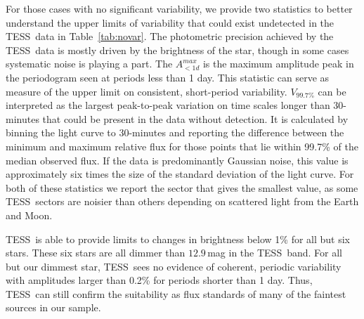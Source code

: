 \documentclass[twocolumn]{aastex631}
\newcommand{\tess}{TESS}
\begin{document}
For those cases with no significant variability, we provide two statistics to better understand the upper limits of variability that could exist undetected in the \tess\ data in Table~\ref{tab:novar}. The photometric precision achieved by the \tess\ data is mostly driven by the brightness of the star, though in some cases systematic noise is playing a part. The $A^{max}_{<1d}$ is the maximum amplitude peak in the periodogram seen at periods less than 1 day. This statistic can serve as measure of the upper limit on consistent, short-period variability. $V_{99.7\%}$ can be interpreted as the largest peak-to-peak variation on time scales longer than 30-minutes that could be present in the data without detection. It is calculated by binning the light curve to 30-minutes and reporting the difference between the minimum and maximum relative flux for those points that lie within 99.7\% of the median observed flux. If the data is predominantly Gaussian noise, this value is approximately six times the size of the standard deviation of the light curve. For both of these statistics we report the sector that gives the smallest value, as some \tess\ sectors are noisier than others depending on scattered light from the Earth and Moon. 

\tess\ is able to provide limits to changes in brightness below 1\%  for all but six stars. These six stars are all dimmer than $12.9$\,mag in the \tess\ band.  For all but our dimmest star, \tess\ sees no evidence of coherent, periodic variability with amplitudes larger than 0.2\% for periods shorter than 1 day. Thus, \tess\ can still confirm the suitability as flux standards of many of the faintest sources in our sample.


\vspace{-1em}
\end{document}
